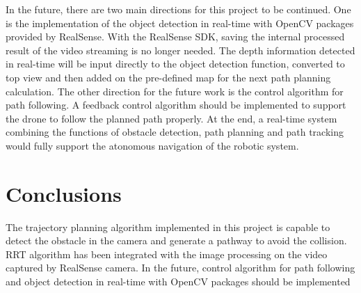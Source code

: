 \documentclass[
  oneside]{ubcthesis}
\begin{document}
In the future, there are two main directions for this project to be continued. One is the implementation of the object detection in real-time with OpenCV packages provided by RealSense. With the RealSense SDK, saving the internal processed result of the video streaming is no longer needed. The depth information detected in real-time will be input directly to the object detection function, converted to top view and then added on the pre-defined map for the next path planning calculation. The other direction for the future work is the control algorithm for path following. A feedback control algorithm should be implemented to support the drone to follow the planned path properly. At the end, a real-time system combining the functions of obstacle detection, path planning and path tracking would fully support the atonomous navigation of the robotic system.

\hypertarget{conclusions}{%
\chapter{Conclusions}\label{conclusions}}

The trajectory planning algorithm implemented in this project is capable to detect the obstacle in the camera and generate a pathway to avoid the collision. RRT algorithm has been integrated with the image processing on the video captured by RealSense camera. In the future, control algorithm for path following and object detection in real-time with OpenCV packages should be implemented

  
\end{document}
